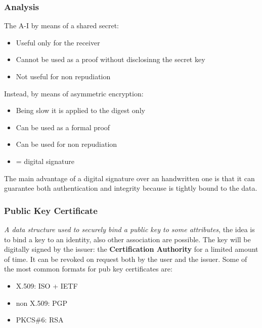 \documentclass[12pt]{article}
\begin{document}
\subsubsection{Analysis}
The A-I by means of a shared secret:
\begin{itemize}
  \item Useful only for the receiver
  \item Cannot be used as a proof without disclosinng the secret key
  \item Not useful for non repudiation
\end{itemize}
Instead, by means of asymmetric encryption:
\begin{itemize}
  \item Being slow it is applied to the digest only
  \item Can be used as a formal proof
  \item Can be used for non repudiation
  \item = digital signature
\end{itemize}

The main advantage of a digital signature over an handwritten one is that it can guarantee both authentication and integrity because is tightly bound to the data.

\subsubsection{Public Key Certificate}
\textit{A data structure used to securely bind a public key to some attributes}, the idea is to bind a key to an identity, also other association are possible. The key will be digitally signed by the issuer: the \textbf{Certification Authority} for a limited amount of time. It can be revoked on request both by the user and the issuer.
Some of the most common formats for pub key certificates are:
\begin{itemize}
  \item X.509: ISO + IETF
  \item non X.509: PGP
  \item PKCS\#6: RSA
\end{itemize}
\end{document}
